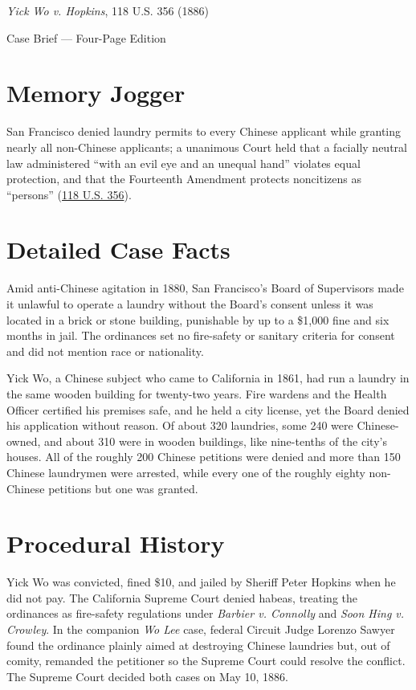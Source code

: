 \documentclass[12pt]{article}
\begin{document}
\begin{center}
{\LARGE \textit{Yick Wo v. Hopkins}, 118 U.S. 356 (1886)\par}
\vspace{0.8em}
{\large Case Brief --- Four-Page Edition\par}
\end{center}
\vspace{1em}

\section{Memory Jogger}

San Francisco denied laundry permits to every Chinese applicant while granting nearly all non-Chinese applicants; a unanimous Court held that a facially neutral law administered ``with an evil eye and an unequal hand'' violates equal protection, and that the Fourteenth Amendment protects noncitizens as ``persons'' (\href{https://supreme.justia.com/cases/federal/us/118/356/}{118 U.S. 356}).

\section{Detailed Case Facts}

Amid anti-Chinese agitation in 1880, San Francisco's Board of Supervisors made it unlawful to operate a laundry without the Board's consent unless it was located in a brick or stone building, punishable by up to a \$1,000 fine and six months in jail. The ordinances set no fire-safety or sanitary criteria for consent and did not mention race or nationality.

Yick Wo, a Chinese subject who came to California in 1861, had run a laundry in the same wooden building for twenty-two years. Fire wardens and the Health Officer certified his premises safe, and he held a city license, yet the Board denied his application without reason. Of about 320 laundries, some 240 were Chinese-owned, and about 310 were in wooden buildings, like nine-tenths of the city's houses. All of the roughly 200 Chinese petitions were denied and more than 150 Chinese laundrymen were arrested, while every one of the roughly eighty non-Chinese petitions but one was granted.

\section{Procedural History}

Yick Wo was convicted, fined \$10, and jailed by Sheriff Peter Hopkins when he did not pay. The California Supreme Court denied habeas, treating the ordinances as fire-safety regulations under \textit{Barbier v. Connolly} and \textit{Soon Hing v. Crowley}. In the companion \textit{Wo Lee} case, federal Circuit Judge Lorenzo Sawyer found the ordinance plainly aimed at destroying Chinese laundries but, out of comity, remanded the petitioner so the Supreme Court could resolve the conflict. The Supreme Court decided both cases on May 10, 1886.
\end{document}
